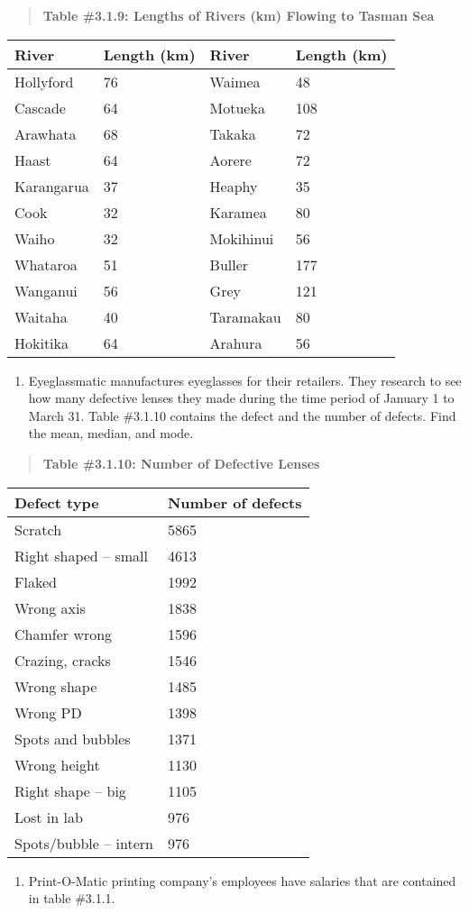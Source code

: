 \documentclass[]{book}
\providecommand{\tightlist}{%
  \setlength{\itemsep}{0pt}\setlength{\parskip}{0pt}}
\begin{document}
\begin{quote}
\textbf{Table \#3.1.9: Lengths of Rivers (km) Flowing to Tasman Sea}
\end{quote}

\begin{longtable}[]{@{}llll@{}}
\toprule
River & Length (km) & River & Length (km)\tabularnewline
\midrule
\endhead
Hollyford & 76 & Waimea & 48\tabularnewline
Cascade & 64 & Motueka & 108\tabularnewline
Arawhata & 68 & Takaka & 72\tabularnewline
Haast & 64 & Aorere & 72\tabularnewline
Karangarua & 37 & Heaphy & 35\tabularnewline
Cook & 32 & Karamea & 80\tabularnewline
Waiho & 32 & Mokihinui & 56\tabularnewline
Whataroa & 51 & Buller & 177\tabularnewline
Wanganui & 56 & Grey & 121\tabularnewline
Waitaha & 40 & Taramakau & 80\tabularnewline
Hokitika & 64 & Arahura & 56\tabularnewline
\bottomrule
\end{longtable}

\begin{enumerate}
\def\labelenumi{\arabic{enumi}.}
\setcounter{enumi}{3}
\tightlist
\item
  Eyeglassmatic manufactures eyeglasses for their retailers. They
  research to see how many defective lenses they made during the time
  period of January 1 to March 31. Table \#3.1.10 contains the defect
  and the number of defects. Find the mean, median, and mode.
\end{enumerate}

\begin{quote}
\textbf{Table \#3.1.10: Number of Defective Lenses}
\end{quote}

\begin{longtable}[]{@{}ll@{}}
\toprule
Defect type & Number of defects\tabularnewline
\midrule
\endhead
Scratch & 5865\tabularnewline
Right shaped -- small & 4613\tabularnewline
Flaked & 1992\tabularnewline
Wrong axis & 1838\tabularnewline
Chamfer wrong & 1596\tabularnewline
Crazing, cracks & 1546\tabularnewline
Wrong shape & 1485\tabularnewline
Wrong PD & 1398\tabularnewline
Spots and bubbles & 1371\tabularnewline
Wrong height & 1130\tabularnewline
Right shape -- big & 1105\tabularnewline
Lost in lab & 976\tabularnewline
Spots/bubble -- intern & 976\tabularnewline
\bottomrule
\end{longtable}

\begin{enumerate}
\def\labelenumi{\arabic{enumi}.}
\setcounter{enumi}{4}
\tightlist
\item
  Print-O-Matic printing company's employees have salaries that are
  contained in table \#3.1.1.
\end{enumerate}
\end{document}
